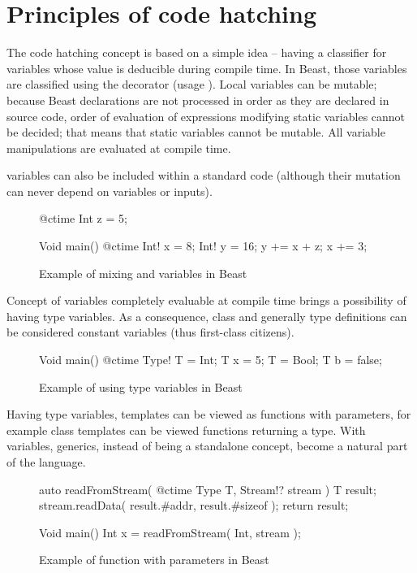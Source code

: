 \documentclass{ExcelAtFIT}
\begin{document}
\section{Principles of code hatching}

The code hatching concept is based on a simple idea -- having a classifier for variables whose value is deducible during compile time. In Beast, those variables are classified using the  decorator (usage ). Local \ctime variables can be mutable; because Beast declarations are not processed in order as they are declared in source code, order of evaluation of expressions modifying static \ctime variables cannot be decided; that means that static \ctime variables cannot be mutable. All \ctime variable manipulations are evaluated at compile time.

\ctime variables can also be included within a standard code (although their mutation can never depend on \nonctime variables or inputs).

\begin{figure}[h]
	\begin{code}
@ctime Int z = 5;
		
Void main() {
	@ctime Int! x = 8;
	Int! y = 16;
	y += x + z;
	x += 3;
}
	\end{code}
	\caption{Example of mixing \ctime and \nonctime variables in Beast}
\end{figure}

Concept of variables completely evaluable at compile time brings a possibility of having \ctime type variables. As a consequence, class and generally type definitions can be considered \ctime constant variables (thus first-class citizens).

\begin{figure}[h]
	\begin{code}
Void main() {
	@ctime Type! T = Int;
	T x = 5;
	T = Bool;
	T b = false;
}
	\end{code}
	\caption{Example of using type variables in Beast}
\end{figure}

Having type variables, templates can be viewed as functions with \ctime parameters, for example class templates can be viewed functions returning a type. With \ctime variables, generics, instead of being a standalone concept, become a natural part of the language.

\begin{figure}[h]
	\begin{code}
auto readFromStream( @ctime Type T, Stream!? stream )
{
	T result;
	stream.readData( result.#addr, result.#sizeof );
	return result;
}

Void main() {
	Int x = readFromStream( Int, stream );
}
	\end{code}
	\caption{Example of function with \ctime parameters in Beast}
\end{figure}
\end{document}
